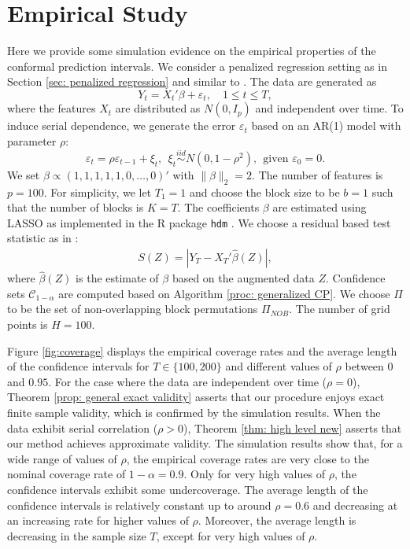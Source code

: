 \documentclass[final,12pt]{colt2018} %
\begin{document}
\section{Empirical Study}
Here we provide some simulation evidence on the empirical properties of the conformal prediction intervals. We consider a penalized regression setting as in Section \ref{sec: penalized regression} and similar to \citet{lei2017distributionfree}. The data are generated as
\begin{equation*}
Y_t=X_t'\beta+\varepsilon_t, \quad 1\le t \le T,
\end{equation*}
where the features $X_t$ are distributed as $N(0,I_p)$ and independent over time. To induce serial dependence, we generate the error $\varepsilon_t$ based on an AR(1) model with parameter $\rho$:
\[
\varepsilon_t = \rho \varepsilon_{t-1}+\xi_t, ~~ \xi_t\overset{iid}\sim N(0,1-\rho^2), ~~ \text{given }\varepsilon_0=0.
\]
We set $\beta  \propto (1,1,1,1,1,0,\dots,0)'$ with $\|\beta\|_2=2$. The number of features is $p=100$. For simplicity, we let $T_1=1$ and choose the block size to be $b=1$ such that the number of blocks is $K=T$. The coefficients $\beta$ are estimated using LASSO as implemented in the \textrm{R} package \texttt{hdm} \citep{hdm}. We choose a residual based test statistic as in \citet{lei2017distributionfree}: 
\begin{eqnarray*}
S(Z)=|Y_T-X_T'\hat\beta (Z)|,
\end{eqnarray*}
where $\hat\beta(Z)$ is the estimate of $\beta$ based on the augmented data $Z$.
Confidence sets $\mathcal{C}_{1-\alpha}$ are computed based on Algorithm \ref{proc: generalized CP}. We choose $\Pi$ to be the set of non-overlapping block permutations $\Pi_{NOB}$. The number of grid points is $H=100$.


Figure \ref{fig:coverage} displays the empirical coverage rates and the average length of the confidence intervals for $T\in \{100,200\}$ and different values of $\rho$ between $0$ and $0.95$. For the case where the data are independent over time ($\rho=0$), Theorem \ref{prop: general exact validity} asserts that our procedure enjoys exact finite sample validity, which is confirmed by the simulation results. When the data exhibit serial correlation ($\rho>0$), Theorem \ref{thm: high level new} asserts that our method achieves approximate validity. The simulation results show that, for a wide range of values of $\rho$, the empirical coverage rates are very close to the nominal coverage rate of $1-\alpha=0.9$. Only for very high values of $\rho$, the confidence intervals exhibit some undercoverage. The average length of the confidence intervals is relatively constant up to around $\rho=0.6$ and decreasing at an increasing rate for higher values of $\rho$. Moreover, the average length is decreasing in the sample size $T$, except for very high values of $\rho$.
\end{document}
